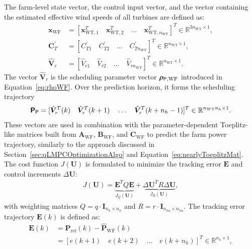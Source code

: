 The farm-level state vector, the control input vector, and the vector containing the estimated effective wind speeds of all turbines are defined as:
\begin{align*}
    \bm{x}_{\text{WF}} &= [\bm{x}_{\text{WT},1}^T \quad \bm{x}_{\text{WT},2}^T \quad \dots \quad \bm{x}_{\text{WT},n_{\text{WT}}}^T ]^T \in {\mathbb{R}}^{3n_\text{WT} \times 1},\\
    \bm{C}_{T}^\prime &= [C_{T1}^\prime \quad C_{T2}^\prime \quad \dots \quad C_{T n_{\text{WT}}}^\prime ]^T \in {\mathbb{R}}^{n_\text{WT} \times 1},\\
    \hat{\bm{V}}_r &= [\hat{V}_{r1} \quad \hat{V}_{r2} \quad \dots \quad \hat{V}_{r n_\text{WT}}]^T \in {\mathbb{R}}^{n_\text{WT}\times 1}.
\end{align*}
The vector $\hat{\bm{V}}_r$ is the scheduling parameter vector $\bm{\rho}_{\mathsf{P},\text{WF}}$ introduced in Equation~\eqref{eq:rhoWF}. Over the prediction horizon, it forms the scheduling trajectory
\begin{align*}
    \bm{\mathsf{P}}_{\mathsf{P}} = [ \hat{\bm{V}}_r^T(k) \quad \hat{\bm{V}}_r^T(k+1) \quad \ldots \quad \hat{\bm{V}}_r^T(k+n_h-1)]^T \in \mathbb{R}^{n_{\text{WT}} n_h \times 1}.
\end{align*}
%
These vectors are used in combination with the parameter-dependent Toeplitz-like matrices built from $\bm{A}_{\text{WF}}$, $\bm{B}_{\text{WF}}$, and $\bm{C}_{\text{WF}}$ to predict the farm power trajectory, similarly to the approach discussed in Section~\ref{sec:qLMPCOptimizationAlgo} and Equation~\eqref{eq:nearlyToeplitzMat}.
The cost function $J(\bm{U})$ is formulated to minimize the tracking error $\bm{E}$ and control increments $\Delta \bm{U}$:
\begin{align} \label{eq:NMPCcostAIC}
    J(\bm{U}) = \underbrace{\bm{E}^T Q \bm{E}}_{J_Q (\bm{U})} + \underbrace{\Delta \bm{U}^T R \Delta \bm{U} }_{J_R ( \bm{U})},
\end{align}
with weighting matrices $Q = q \cdot \bm{I}_{n_h \times n_h}$ and $R = r \cdot \bm{I}_{n_{hu}\times n_{hu}}$. The tracking error trajectory $\bm{E}(k)$ is defined as:
\begin{equation}\label{eq:errortraject}
    \begin{aligned}
        \bm{E}(k) &= \bm{P}_{\text{ref}}(k) - \hat{\bm{P}}_{\text{WF}}(k) \\
        &= [ e(k+1) \quad e(k+2) \quad \dots \quad e(k + n_h) ]^T \in \mathbb{R}^{n_h \times 1},
    \end{aligned}
\end{equation}
